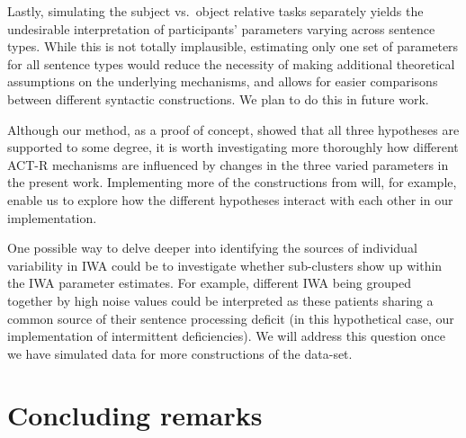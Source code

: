 \documentclass{cambridge7A}\usepackage[]{graphicx}\usepackage[]{color}
\begin{document}
Lastly, simulating the subject vs.\ object relative tasks separately yields the undesirable interpretation of participants' parameters varying across sentence types. While this is not totally implausible, estimating only one set of parameters for all sentence types would reduce the necessity of making additional theoretical assumptions on the underlying mechanisms, and allows for easier comparisons between different syntactic constructions.  We plan to do this in future work.

Although our method, as a proof of concept, showed that all three hypotheses are supported to some degree, it is worth investigating more thoroughly how different ACT-R mechanisms are influenced by changes in the three varied parameters in the present work. Implementing more of the constructions from \cite{CaplanEtAl2015} will, for example, enable us to explore how the different hypotheses interact with each other in our implementation. 

One possible way to delve deeper into identifying the sources of individual variability in IWA could be to investigate whether sub-clusters show up within the IWA parameter estimates.
For example, different IWA being grouped together by high noise values could be interpreted as these patients sharing a common source of their sentence processing deficit (in this hypothetical case, our implementation of intermittent deficiencies). We will address this question once we have simulated data for more constructions of the \cite{CaplanEtAl2015} data-set.

\section{Concluding remarks}
\end{document}

